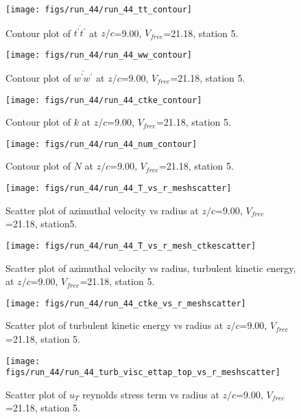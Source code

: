 \begin{figure}[H]
\centering
\texttt{[image: figs/run\_44/run\_44\_tt\_contour]}
\caption{Contour plot of $\overline{t^\prime t^\prime}$ at $z/c$=9.00, $V_{free}$=21.18, station 5.}
\end{figure}


\begin{figure}[H]
\centering
\texttt{[image: figs/run\_44/run\_44\_ww\_contour]}
\caption{Contour plot of $\overline{w^\prime w^\prime}$ at $z/c$=9.00, $V_{free}$=21.18, station 5.}
\end{figure}


\begin{figure}[H]
\centering
\texttt{[image: figs/run\_44/run\_44\_ctke\_contour]}
\caption{Contour plot of $k$ at $z/c$=9.00, $V_{free}$=21.18, station 5.}
\end{figure}


\begin{figure}[H]
\centering
\texttt{[image: figs/run\_44/run\_44\_num\_contour]}
\caption{Contour plot of $N$ at $z/c$=9.00, $V_{free}$=21.18, station 5.}
\end{figure}


\begin{figure}[H]
\centering
\texttt{[image: figs/run\_44/run\_44\_T\_vs\_r\_meshscatter]}
\caption{Scatter plot of azimuthal velocity vs radius at $z/c$=9.00, $V_{free}$=21.18, station5.}
\end{figure}


\begin{figure}[H]
\centering
\texttt{[image: figs/run\_44/run\_44\_T\_vs\_r\_mesh\_ctkescatter]}
\caption{Scatter plot of azimuthal velocity vs radius, turbulent kinetic energy, at $z/c$=9.00, $V_{free}$=21.18, station 5.}
\end{figure}


\begin{figure}[H]
\centering
\texttt{[image: figs/run\_44/run\_44\_ctke\_vs\_r\_meshscatter]}
\caption{Scatter plot of turbulent kinetic energy vs radius at $z/c$=9.00, $V_{free}$=21.18, station 5.}
\end{figure}


\begin{figure}[H]
\centering
\texttt{[image: figs/run\_44/run\_44\_turb\_visc\_ettap\_top\_vs\_r\_meshscatter]}
\caption{Scatter plot of $
u_T$ reynolds stress term vs radius at $z/c$=9.00, $V_{free}$=21.18, station 5.}
\end{figure}


